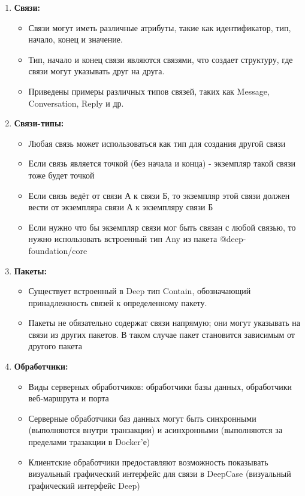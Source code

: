 \documentclass{article}
\begin{document}
\begin{enumerate}
  \item \textbf{Связи:}
        \begin{itemize}
          \item Связи могут иметь различные атрибуты, такие как идентификатор,
                тип, начало, конец и значение.
          \item Тип, начало и конец связи являются связями, что создает
                структуру, где связи могут указывать друг на друга.
          \item Приведены примеры различных типов связей, таких как Message,
                Conversation, Reply и др.
        \end{itemize}

  \item \textbf{Связи-типы:}
        \begin{itemize}
          \item Любая связь может использоваться как тип для создания другой
                связи
          \item Если связь является точкой (без начала и конца) - экземпляр
                такой связи тоже будет точкой
          \item Если связь ведёт от связи А к связи Б, то экземпляр этой связи
                должен вести от экземпляра связи А к экземпляру связи Б
          \item Если нужно что бы экземпляр связи мог быть связан с любой
                связью,
                то нужно использовать встроенный тип Any из пакета
                @deep-foundation/core
        \end{itemize}

  \item \textbf{Пакеты:}
        \begin{itemize}
          \item Существует встроенный в Deep тип Contain, обозначающий
                принадлежность связей к определенному пакету.
          \item Пакеты не обязательно содержат связи напрямую; они могут
                указывать на связи из других пакетов. В таком случае пакет становится зависимым от другого пакета
        \end{itemize}

  \item \textbf{Обработчики:}
        \begin{itemize}
          \item Виды серверных обработчиков: обработчики базы данных,
                обработчики веб-маршрута и порта
          \item Серверные обработчики баз данных могут быть синхронными (выполняются внутри транзакции) и асинхронными (выполняются за пределами тразакции в Docker'е)
          \item Клиентские обработчики предоставляют возможность показывать
                визуальный графический интерфейс для связи в DeepCase
                (визуальный графический
                интерфейс Deep)
        \end{itemize}


\end{enumerate}
\end{document}
